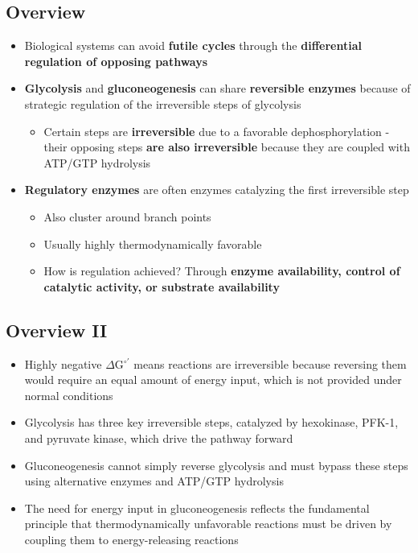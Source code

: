 \documentclass[10pt]{article}
\begin{document}
\subsection*{Overview}
\begin{itemize}
	\item Biological systems can avoid \textbf{futile cycles} through the \textbf{differential regulation of opposing pathways}
	\item \textbf{Glycolysis} and \textbf{gluconeogenesis} can share \textbf{reversible enzymes} because of strategic regulation of the irreversible steps of glycolysis
	\begin{itemize}
        \item Certain steps are \textbf{irreversible} due to a favorable dephosphorylation - their opposing steps \textbf{are also irreversible} because they are coupled with ATP/GTP hydrolysis
    \end{itemize}
    \item \textbf{Regulatory enzymes} are often enzymes catalyzing the first irreversible step
    \begin{itemize}
        \item Also cluster around branch points
        \item Usually highly thermodynamically favorable
        \item How is regulation achieved?  Through \textbf{enzyme availability, control of catalytic activity, or substrate availability}
    \end{itemize}
\end{itemize}
\subsection*{Overview II}
\begin{itemize}
	\item Highly negative $\Delta$G${^{\circ '}}$ means reactions are irreversible because reversing them would require an equal amount of energy input, which is not provided under normal conditions
	\item Glycolysis has three key irreversible steps, catalyzed by hexokinase, PFK-1, and pyruvate kinase, which drive the pathway forward
	\item Gluconeogenesis cannot simply reverse glycolysis and must bypass these steps using alternative enzymes and ATP/GTP hydrolysis
	\item The need for energy input in gluconeogenesis reflects the fundamental principle that thermodynamically unfavorable reactions must be driven by coupling them to energy-releasing reactions
\end{itemize}
\end{document}

